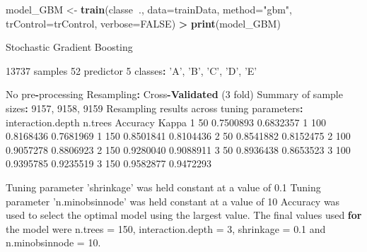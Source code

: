 \documentclass[]{article}
\newenvironment{Shaded}{\begin{snugshade}}{\end{snugshade}}
\newcommand{\ControlFlowTok}[1]{\textcolor[rgb]{0.13,0.29,0.53}{\textbf{#1}}}
\newcommand{\DataTypeTok}[1]{\textcolor[rgb]{0.13,0.29,0.53}{#1}}
\newcommand{\DecValTok}[1]{\textcolor[rgb]{0.00,0.00,0.81}{#1}}
\newcommand{\FloatTok}[1]{\textcolor[rgb]{0.00,0.00,0.81}{#1}}
\newcommand{\KeywordTok}[1]{\textcolor[rgb]{0.13,0.29,0.53}{\textbf{#1}}}
\newcommand{\NormalTok}[1]{#1}
\newcommand{\OperatorTok}[1]{\textcolor[rgb]{0.81,0.36,0.00}{\textbf{#1}}}
\newcommand{\OtherTok}[1]{\textcolor[rgb]{0.56,0.35,0.01}{#1}}
\newcommand{\StringTok}[1]{\textcolor[rgb]{0.31,0.60,0.02}{#1}}
\begin{document}
\begin{Shaded}
\begin{Highlighting}[]

\NormalTok{model_GBM <-}\StringTok{ }\KeywordTok{train}\NormalTok{(classe}\OperatorTok{~}\NormalTok{., }\DataTypeTok{data=}\NormalTok{trainData, }\DataTypeTok{method=}\StringTok{"gbm"}\NormalTok{, }\DataTypeTok{trControl=}\NormalTok{trControl, }\DataTypeTok{verbose=}\OtherTok{FALSE}\NormalTok{)}
\OperatorTok{>}\StringTok{ }\KeywordTok{print}\NormalTok{(model_GBM)}

\NormalTok{Stochastic Gradient Boosting}
 
\DecValTok{13737}\NormalTok{ samples}
   \DecValTok{52}\NormalTok{ predictor}
    \DecValTok{5}\NormalTok{ classes}\OperatorTok{:}\StringTok{ 'A'}\NormalTok{, }\StringTok{'B'}\NormalTok{, }\StringTok{'C'}\NormalTok{, }\StringTok{'D'}\NormalTok{, }\StringTok{'E'}
 
\NormalTok{No pre}\OperatorTok{-}\NormalTok{processing}
\NormalTok{Resampling}\OperatorTok{:}\StringTok{ }\NormalTok{Cross}\OperatorTok{-}\KeywordTok{Validated}\NormalTok{ (}\DecValTok{3}\NormalTok{ fold)}
\NormalTok{Summary of sample sizes}\OperatorTok{:}\StringTok{ }\DecValTok{9157}\NormalTok{, }\DecValTok{9158}\NormalTok{, }\DecValTok{9159}
\NormalTok{Resampling results across tuning parameters}\OperatorTok{:}
\StringTok{ }
\StringTok{  }\NormalTok{interaction.depth  n.trees  Accuracy   Kappa  }
  \DecValTok{1}                 \DecValTok{50}      \FloatTok{0.7500893}  \FloatTok{0.6832357}
  \DecValTok{1}                 \DecValTok{100}     \FloatTok{0.8168436}  \FloatTok{0.7681969}
  \DecValTok{1}                 \DecValTok{150}     \FloatTok{0.8501841}  \FloatTok{0.8104436}
  \DecValTok{2}                 \DecValTok{50}      \FloatTok{0.8541882}  \FloatTok{0.8152475}
  \DecValTok{2}                 \DecValTok{100}     \FloatTok{0.9057278}  \FloatTok{0.8806923}
  \DecValTok{2}                 \DecValTok{150}     \FloatTok{0.9280040}  \FloatTok{0.9088911}
  \DecValTok{3}                 \DecValTok{50}      \FloatTok{0.8936438}  \FloatTok{0.8653523}
  \DecValTok{3}                 \DecValTok{100}     \FloatTok{0.9395785}  \FloatTok{0.9235519}
  \DecValTok{3}                 \DecValTok{150}     \FloatTok{0.9582877}  \FloatTok{0.9472293}
 
\NormalTok{Tuning parameter }\StringTok{'shrinkage'}\NormalTok{ was held constant at a value}
\NormalTok{of }\FloatTok{0.1}
\NormalTok{Tuning parameter }\StringTok{'n.minobsinnode'}\NormalTok{ was held constant}
\NormalTok{at a value of }\DecValTok{10}
\NormalTok{Accuracy was used to select the optimal model using the}
\NormalTok{largest value.}
\NormalTok{The final values used }\ControlFlowTok{for}\NormalTok{ the model were n.trees =}
\DecValTok{150}\NormalTok{, interaction.depth =}\StringTok{ }\DecValTok{3}\NormalTok{, shrinkage =}\StringTok{ }\FloatTok{0.1}\NormalTok{ and}
\NormalTok{n.minobsinnode =}\StringTok{ }\FloatTok{10.}
\end{Highlighting}
\end{Shaded}
\end{document}
